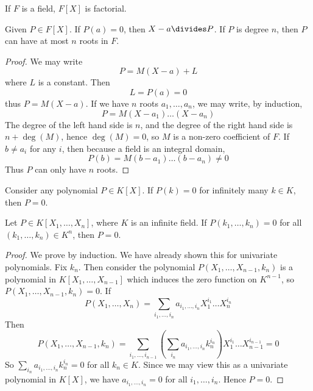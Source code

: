 \begin{corollary}
    If $F$ is a field, $F[X]$ is factorial.
\end{corollary}

\begin{theorem}
    Given $P \in F[X]$. If $P(a) = 0$, then $X - a \divides P$. If $P$ is degree $n$, then $P$ can have at most $n$ roots in $F$.
\end{theorem}
\begin{proof}
    We may write
    \[ P = M(X - a) + L \]
    where $L$ is a constant. Then
    \[ L = P(a) = 0 \]
    thus $P = M(X - a)$. If we have $n$ roots $a_1, \dots, a_n$, we may write, by induction,
    \[ P = M (X - a_1) \dots (X - a_n) \]
    The degree of the left hand side is $n$, and the degree of the right hand side is $n + \deg(M)$, hence $\deg(M) = 0$, so $M$ is a non-zero coefficient of $F$. If $b \neq a_i$ for any $i$, then because a field is an integral domain,
    \[ P(b) = M(b - a_1) \dots (b - a_n) \neq 0 \]
    Thus $P$ can only have $n$ roots.
\end{proof}

\begin{corollary}
    Consider any polynomial $P \in K[X]$. If $P(k) = 0$ for infinitely many $k \in K$, then $P = 0$.
\end{corollary}

\begin{corollary}
    Let $P \in K[X_1, \dots, X_n]$, where $K$ is an infinite field. If $P(k_1, \dots, k_n) = 0$ for all $(k_1, \dots, k_n) \in K^n$, then $P = 0$.
\end{corollary}
\begin{proof}
    We prove by induction. We have already shown this for univariate polynomials. Fix $k_n$. Then consider the polynomial $P(X_1, \dots, X_{n-1}, k_n)$ is a polynomial in $K[X_1, \dots, X_{n-1}]$ which induces the zero function on $K^{n-1}$, so $P(X_1, \dots, X_{n-1}, k_n) = 0$. If
    \[ P(X_1, \dots, X_n) = \sum_{i_1, \dots, i_n} a_{i_1, \dots, i_n} X_1^{i_1} \dots X_n^{i_n} \]
    Then
    \[ P(X_1, \dots, X_{n-1}, k_n) = \sum_{i_1, \dots, i_{n-1}} \left(\sum_{i_n} a_{i_1, \dots, i_n} k_n^{i_n} \right) X_1^{i_1} \dots X_{n-1}^{i_{n-1}} = 0 \]
    So $\sum_{i_n} a_{i_1, \dots, i_n} k_n^{i_n} = 0$ for all $k_n \in K$. Since we may view this as a univariate polynomial in $K[X]$, we have $a_{i_1, \dots, i_n} = 0$ for all $i_1, \dots, i_n$. Hence $P = 0$.
\end{proof}

